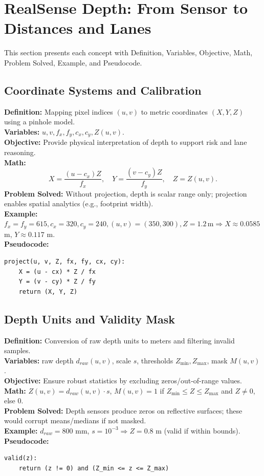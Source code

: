 \documentclass[11pt,a4paper]{article}
\begin{document}
\section{RealSense Depth: From Sensor to Distances and Lanes}
This section presents each concept with Definition, Variables, Objective, Math, Problem Solved, Example, and Pseudocode.

\subsection{Coordinate Systems and Calibration}
\textbf{Definition:} Mapping pixel indices $(u,v)$ to metric coordinates $(X,Y,Z)$ using a pinhole model.\\
\textbf{Variables:} $u,v, f_x,f_y, c_x,c_y, Z(u,v)$.\\
\textbf{Objective:} Provide physical interpretation of depth to support risk and lane reasoning.\\
\textbf{Math:}
\begin{equation}
X = \frac{(u-c_x)Z}{f_x},\quad Y = \frac{(v-c_y)Z}{f_y},\quad Z = Z(u,v).
\end{equation}
\textbf{Problem Solved:} Without projection, depth is scalar range only; projection enables spatial analytics (e.g., footprint width).\\
\textbf{Example:} $f_x=f_y=615,c_x=320,c_y=240,(u,v)=(350,300),Z=1.2\,\text{m} \Rightarrow X\approx0.0585$ m, $Y\approx0.117$ m.\\
\textbf{Pseudocode:}
\begin{lstlisting}[style=code]
project(u, v, Z, fx, fy, cx, cy):
    X = (u - cx) * Z / fx
    Y = (v - cy) * Z / fy
    return (X, Y, Z)
\end{lstlisting}

\subsection{Depth Units and Validity Mask}
\textbf{Definition:} Conversion of raw depth units to meters and filtering invalid samples.\\
\textbf{Variables:} raw depth $d_{raw}(u,v)$, scale $s$, thresholds $Z_{\min}, Z_{\max}$, mask $M(u,v)$.\\
\textbf{Objective:} Ensure robust statistics by excluding zeros/out-of-range values.\\
\textbf{Math:} $Z(u,v)=d_{raw}(u,v) \cdot s$, \; $M(u,v)=1$ if $Z_{\min}\le Z \le Z_{\max}$ and $Z\ne0$, else $0$.\\
\textbf{Problem Solved:} Depth sensors produce zeros on reflective surfaces; these would corrupt means/medians if not masked.\\
\textbf{Example:} $d_{raw}=800$ mm, $s=10^{-3}\Rightarrow Z=0.8$ m (valid if within bounds).\\
\textbf{Pseudocode:}
\begin{lstlisting}[style=code]
valid(z):
    return (z != 0) and (Z_min <= z <= Z_max)
\end{lstlisting}
\end{document}
